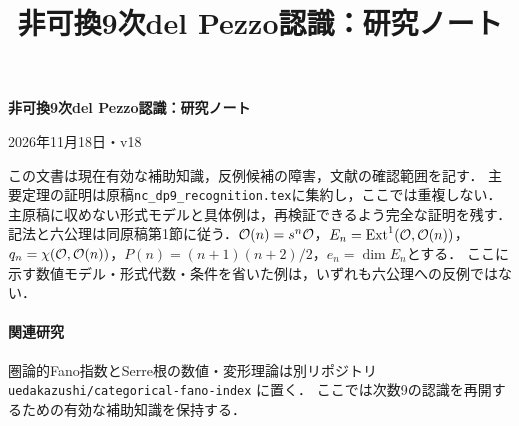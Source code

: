\documentclass[11pt,a4paper]{ltjsarticle}
\title{非可換9次del Pezzo認識：研究ノート}
\author{}
\date{\versiondate}
\renewcommand{\versiondate}{2026年11月18日・v18}
\begin{document}
\begin{center}
{\Large\bfseries 非可換9次del Pezzo認識：研究ノート\par}
\vspace{0.8em}
\versiondate\par
\end{center}
\vspace{0.5em}
この文書は現在有効な補助知識，反例候補の障害，文献の確認範囲を記す．
主要定理の証明は原稿\texttt{nc\_dp9\_recognition.tex}に集約し，ここでは重複しない．
主原稿に収めない形式モデルと具体例は，再検証できるよう完全な証明を残す．
記法と六公理は同原稿第1節に従う．$\mathcal O(n)=s^n\mathcal O$，$E_n=\operatorname{Ext}^1(\mathcal O,\mathcal O(n))$，
$q_n=\chi(\mathcal O,\mathcal O(n))$，$P(n)=(n+1)(n+2)/2$，$e_n=\dim E_n$とする．
ここに示す数値モデル・形式代数・条件を省いた例は，いずれも六公理への反例ではない．
\begingroup\fontsize{11}{14}\selectfont
\tableofcontents
\endgroup

\paragraph{関連研究}
圏論的Fano指数とSerre根の数値・変形理論は別リポジトリ
\texttt{uedakazushi/categorical-fano-index} に置く．
ここでは次数9の認識を再開するための有効な補助知識を保持する．
\end{document}
